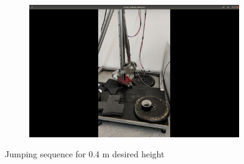 \documentclass[onecolumn, letter paper]{report}
\begin{document}
\begin{figure}[htb!]
\begin{subfigure}{.24\textwidth}
    \end{subfigure}
    \begin{subfigure}{.24\textwidth}
    \includegraphics[width=\textwidth, trim={25cm 10cm 25cm 10cm}, clip]{figures/0.4m/p4m4.png}
    \end{subfigure}
    \caption{Jumping sequence for 0.4 m desired height}
    \label{fig:sequence4}
\end{figure}
\end{document}
